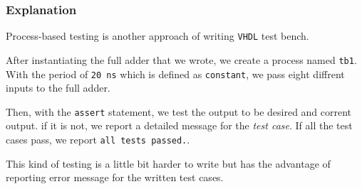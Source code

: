 \documentclass[dvipsnames, svgnames, x11names, a4paper, 11pt,]{article}
\begin{document}
\subsubsection{Explanation}
Process-based testing is another approach of writing \texttt{VHDL} test bench.

After instantiating the full adder that we wrote, we create a process named \texttt{tb1}. With the period of \texttt{20 ns} which is defined as \texttt{constant}, we pass eight diffrent inputs to the full adder.

Then, with the \texttt{assert} statement, we test the output to be desired and corrent output.
if it is not, we report a detailed message for the \textit{test case}. If all the test cases pass, we report \texttt{all tests passed.}.

This kind of testing is a little bit harder to write but has the advantage of reporting error message for the written test cases.
\end{document}

